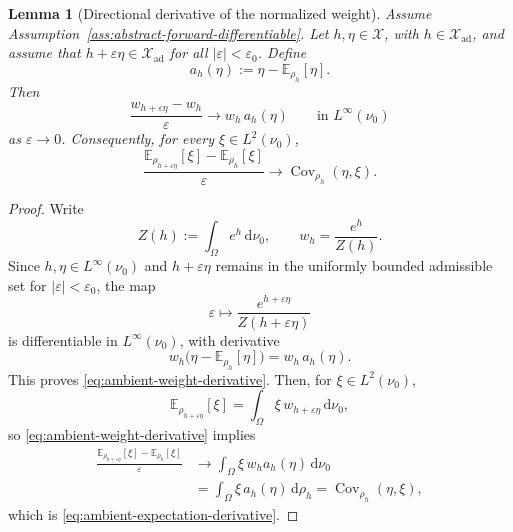 \documentclass{article}
\newtheorem{lemma}[theorem]{Lemma}
\theoremstyle{definition}
\renewcommand{\d}{\mathrm{d}}
\begin{document}
\begin{lemma}[Directional derivative of the normalized weight]
    \label{lem:ambient-weight-derivative}
    Assume Assumption~\ref{ass:abstract-forward-differentiable}. Let \(h,\eta\in\mathcal X\),
    with \(h\in\mathcal X_{\mathrm{ad}}\), and assume that
    \(h+\varepsilon\eta\in\mathcal X_{\mathrm{ad}}\) for all \(|\varepsilon|<\varepsilon_0\). Define
    \[
        a_h(\eta):=\eta-\mathbb E_{\rho_h}[\eta].
    \]
    Then
    \begin{equation}
        \label{eq:ambient-weight-derivative}
        \frac{w_{h+\varepsilon\eta}-w_h}{\varepsilon}
        \to
        w_h\,a_h(\eta)
        \qquad\text{in }L^\infty(\nu_0)
    \end{equation}
    as \(\varepsilon\to 0\). Consequently, for every \(\xi\in L^2(\nu_0)\),
    \begin{equation}
        \label{eq:ambient-expectation-derivative}
        \frac{\mathbb E_{\rho_{h+\varepsilon\eta}}[\xi]-\mathbb E_{\rho_h}[\xi]}{\varepsilon}
        \to
        \operatorname{Cov}_{\rho_h}(\eta,\xi).
    \end{equation}
\end{lemma}

\begin{proof}
    Write
    \[
        Z(h):=\int_\Omega e^h\,\d\nu_0,
        \qquad
        w_h=\frac{e^h}{Z(h)}.
    \]
    Since \(h,\eta\in L^\infty(\nu_0)\) and \(h+\varepsilon\eta\) remains in the uniformly bounded
    admissible set for \(|\varepsilon|<\varepsilon_0\), the map
    \[
        \varepsilon\longmapsto \frac{e^{h+\varepsilon\eta}}{Z(h+\varepsilon\eta)}
    \]
    is differentiable in \(L^\infty(\nu_0)\), with derivative
    \[
        w_h\bigl(\eta-\mathbb E_{\rho_h}[\eta]\bigr)
        =
        w_h\,a_h(\eta).
    \]
    This proves \eqref{eq:ambient-weight-derivative}. Then, for \(\xi\in L^2(\nu_0)\),
    \[
        \mathbb E_{\rho_{h+\varepsilon\eta}}[\xi]
        =
        \int_\Omega \xi\,w_{h+\varepsilon\eta}\,\d\nu_0,
    \]
    so \eqref{eq:ambient-weight-derivative} implies
    \begin{align*}
        \frac{\mathbb E_{\rho_{h+\varepsilon\eta}}[\xi]-\mathbb E_{\rho_h}[\xi]}{\varepsilon}
         & \to
        \int_\Omega \xi\,w_h a_h(\eta)\,\d\nu_0 \\
         & =
        \int_\Omega \xi\,a_h(\eta)\,\d\rho_h
        =
        \operatorname{Cov}_{\rho_h}(\eta,\xi),
    \end{align*}
    which is \eqref{eq:ambient-expectation-derivative}.
\end{proof}
\end{document}
